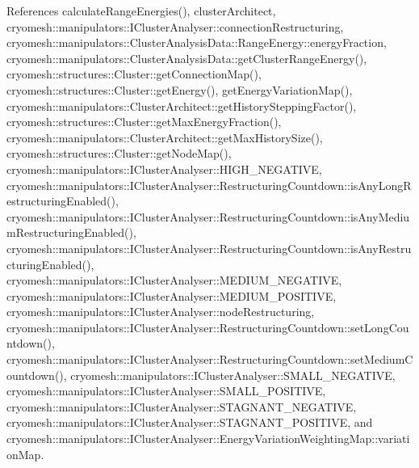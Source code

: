 \-References calculate\-Range\-Energies(), cluster\-Architect, cryomesh\-::manipulators\-::\-I\-Cluster\-Analyser\-::connection\-Restructuring, cryomesh\-::manipulators\-::\-Cluster\-Analysis\-Data\-::\-Range\-Energy\-::energy\-Fraction, cryomesh\-::manipulators\-::\-Cluster\-Analysis\-Data\-::get\-Cluster\-Range\-Energy(), cryomesh\-::structures\-::\-Cluster\-::get\-Connection\-Map(), cryomesh\-::structures\-::\-Cluster\-::get\-Energy(), get\-Energy\-Variation\-Map(), cryomesh\-::manipulators\-::\-Cluster\-Architect\-::get\-History\-Stepping\-Factor(), cryomesh\-::structures\-::\-Cluster\-::get\-Max\-Energy\-Fraction(), cryomesh\-::manipulators\-::\-Cluster\-Architect\-::get\-Max\-History\-Size(), cryomesh\-::structures\-::\-Cluster\-::get\-Node\-Map(), cryomesh\-::manipulators\-::\-I\-Cluster\-Analyser\-::\-H\-I\-G\-H\-\_\-\-N\-E\-G\-A\-T\-I\-V\-E, cryomesh\-::manipulators\-::\-I\-Cluster\-Analyser\-::\-Restructuring\-Countdown\-::is\-Any\-Long\-Restructuring\-Enabled(), cryomesh\-::manipulators\-::\-I\-Cluster\-Analyser\-::\-Restructuring\-Countdown\-::is\-Any\-Medium\-Restructuring\-Enabled(), cryomesh\-::manipulators\-::\-I\-Cluster\-Analyser\-::\-Restructuring\-Countdown\-::is\-Any\-Restructuring\-Enabled(), cryomesh\-::manipulators\-::\-I\-Cluster\-Analyser\-::\-M\-E\-D\-I\-U\-M\-\_\-\-N\-E\-G\-A\-T\-I\-V\-E, cryomesh\-::manipulators\-::\-I\-Cluster\-Analyser\-::\-M\-E\-D\-I\-U\-M\-\_\-\-P\-O\-S\-I\-T\-I\-V\-E, cryomesh\-::manipulators\-::\-I\-Cluster\-Analyser\-::node\-Restructuring, cryomesh\-::manipulators\-::\-I\-Cluster\-Analyser\-::\-Restructuring\-Countdown\-::set\-Long\-Countdown(), cryomesh\-::manipulators\-::\-I\-Cluster\-Analyser\-::\-Restructuring\-Countdown\-::set\-Medium\-Countdown(), cryomesh\-::manipulators\-::\-I\-Cluster\-Analyser\-::\-S\-M\-A\-L\-L\-\_\-\-N\-E\-G\-A\-T\-I\-V\-E, cryomesh\-::manipulators\-::\-I\-Cluster\-Analyser\-::\-S\-M\-A\-L\-L\-\_\-\-P\-O\-S\-I\-T\-I\-V\-E, cryomesh\-::manipulators\-::\-I\-Cluster\-Analyser\-::\-S\-T\-A\-G\-N\-A\-N\-T\-\_\-\-N\-E\-G\-A\-T\-I\-V\-E, cryomesh\-::manipulators\-::\-I\-Cluster\-Analyser\-::\-S\-T\-A\-G\-N\-A\-N\-T\-\_\-\-P\-O\-S\-I\-T\-I\-V\-E, and cryomesh\-::manipulators\-::\-I\-Cluster\-Analyser\-::\-Energy\-Variation\-Weighting\-Map\-::variation\-Map.

